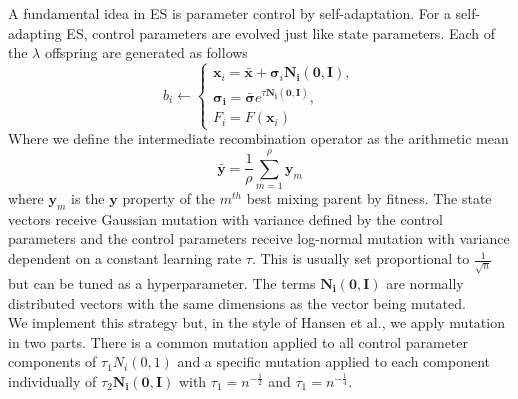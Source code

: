 A fundamental idea in ES is parameter control by self-adaptation. For a self-adapting ES, control parameters are evolved just like state parameters. Each of the $\lambda$ offspring are generated as follows
\[b_i \gets
\begin{cases}
    \bm{x}_i = \bar{\bm{x}} + \bm{\sigma}_i\bm{N_i(0, I)},\\
    \bm{\sigma_i} = \bar{\bm{\sigma}}e^{\tau\bm{N_i(0, I)}},\\
    F_i = F(\bm{x}_i)
\end{cases}
\]
Where we define the intermediate recombination operator as the arithmetic mean
\[
  \bar{\bm{y}} = \frac{1}{\rho}\sum_{m=1}^{\rho}{\bm{y}_m}
\]
where $\bm{y}_m$ is the $\bm{y}$ property of the $m^{th}$ best mixing parent by fitness. The state vectors receive Gaussian mutation with variance defined by the control parameters and the control parameters receive log-normal mutation with variance dependent on a constant learning rate $\tau$. This is usually set proportional to $\frac{1}{\sqrt{n}}$ but can be tuned as a hyperparameter. The terms $\bm{N_i(0, I)}$ are normally distributed vectors with the same dimensions as the vector being mutated.\\

We implement this strategy but, in the style of Hansen et al.\cite{hansen2015evolution}, we apply mutation in two parts. There is a common mutation applied to all control parameter components of $\tau_1{N_i(0, 1)}$ and a specific mutation applied to each component individually of $\tau_2\bm{N_i(0, I)}$ with $\tau_1 = n^{-\frac{1}{2}}$ and $\tau_1 = n^{-\frac{1}{4}}$.\\




